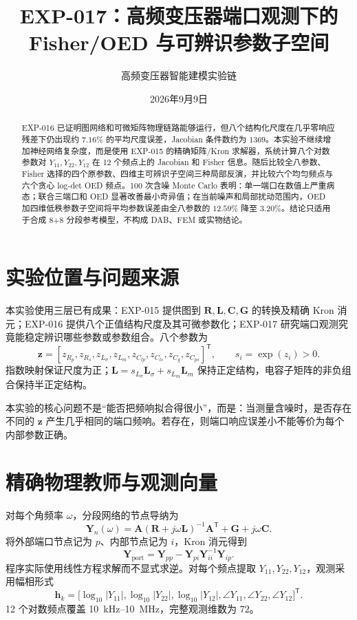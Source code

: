 \documentclass[11pt,a4paper]{ctexart}
\title{EXP-017：高频变压器端口观测下的\\Fisher/OED 与可辨识参数子空间}
\author{高频变压器智能建模实验链}
\date{2026年9月9日}
\begin{document}
\maketitle

\begin{abstract}
EXP-016 已证明图网络和可微矩阵物理链路能够运行，但八个结构化尺度在几乎零响应残差下仍出现约 $7.16\%$ 的平均尺度误差，Jacobian 条件数约为 $1369$。本实验不继续增加神经网络复杂度，而是使用 EXP-015 的精确矩阵/Kron 求解器，系统计算八个对数参数对 $Y_{11},Y_{22},Y_{12}$ 在 12 个频点上的 Jacobian 和 Fisher 信息。随后比较全八参数、Fisher 选择的四个原参数、四维主可辨识子空间三种局部反演，并比较六个均匀频点与六个贪心 log-det OED 频点。100 次含噪 Monte Carlo 表明：单一端口在数值上严重病态；联合三端口和 OED 显著改善最小奇异值；在当前噪声和局部扰动范围内，OED 加四维低秩参数子空间将平均参数误差由全八参数的 $12.59\%$ 降至 $3.20\%$。结论只适用于合成 8+8 分段参考模型，不构成 DAB、FEM 或实物结论。
\end{abstract}

\section{实验位置与问题来源}
本实验使用三层已有成果：EXP-015 提供图到 $\bm R,\bm L,\bm C,\bm G$ 的转换及精确 Kron 消元；EXP-016 提供八个正值结构尺度及其可微参数化；EXP-017 研究端口观测究竟能稳定辨识哪些参数或参数组合。八个参数为
\begin{equation}
\bm z=[z_{R_p},z_{R_s},z_{L_\sigma},z_{L_m},z_{C_{lp}},z_{C_{ls}},z_{C_g},z_{C_{ps}}]^\mathsf{T},
\qquad s_i=\exp(z_i)>0.
\end{equation}
指数映射保证尺度为正；$\bm L=s_{L_\sigma}\bm L_\sigma+s_{L_m}\bm L_m$ 保持正定结构，电容子矩阵的非负组合保持半正定结构。

本实验的核心问题不是``能否把频响拟合得很小''，而是：当测量含噪时，是否存在不同的 $\bm z$ 产生几乎相同的端口频响。若存在，则端口响应误差小不能等价为每个内部参数正确。

\section{精确物理教师与观测向量}
对每个角频率 $\omega$，分段网络的节点导纳为
\begin{equation}
\bm Y_n(\omega)=\bm A(\bm R+j\omega\bm L)^{-1}\bm A^\mathsf{T}+\bm G+j\omega\bm C.
\end{equation}
将外部端口节点记为 $p$、内部节点记为 $i$，Kron 消元得到
\begin{equation}
\bm Y_{\mathrm{port}}=\bm Y_{pp}-\bm Y_{pi}\bm Y_{ii}^{-1}\bm Y_{ip}.
\end{equation}
程序实际使用线性方程求解而不显式求逆。对每个频点提取 $Y_{11},Y_{22},Y_{12}$，观测采用幅相形式
\begin{equation}
\bm h_k=\bigl[\log_{10}|Y_{11}|,\log_{10}|Y_{22}|,\log_{10}|Y_{12}|,
\angle Y_{11},\angle Y_{22},\angle Y_{12}\bigr]^\mathsf{T}.
\end{equation}
12 个对数频点覆盖 \SI{10}{kHz}--\SI{10}{MHz}，完整观测维数为 $72$。
\end{document}
